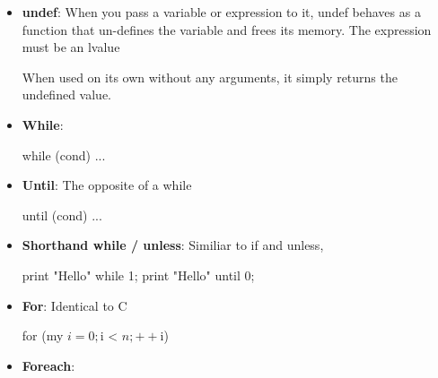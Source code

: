 \documentclass{report}
\begin{document}
\begin{itemize}
        \item \textbf{undef}: When you pass a variable or expression to it, undef behaves as a function that un-defines the variable and frees its memory. The expression must be an lvalue
            \bigbreak \noindent 
            \bigbreak \noindent 
            When used on its own without any arguments, it simply returns the undefined value.
            \bigbreak \noindent 
        \item \textbf{While}: 
            \bigbreak \noindent 
            \begin{perlcode}
                while (cond) {
                    ...
                }
            \end{perlcode}
        \item \textbf{Until}: The opposite of a while
            \bigbreak \noindent 
            \begin{perlcode}
                until (cond) {
                    ...
                }
            \end{perlcode}
        \item \textbf{Shorthand while / unless}: Similiar to if and unless,
            \bigbreak \noindent 
            \begin{perlcode}
            print "Hello" while 1;
            print "Hello" until 0;
            \end{perlcode}
        \item \textbf{For}: Identical to C
            \bigbreak \noindent 
            \begin{perlcode}
            for (my $i = 0; $i < $n; ++$i)
            \end{perlcode}
        \item \textbf{Foreach}:
            \bigbreak \noindent 
\end{itemize}
\end{document}
